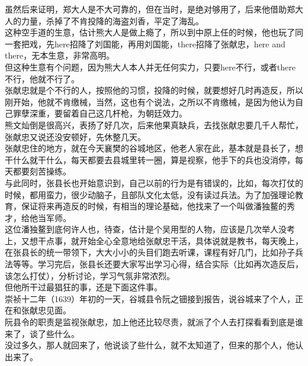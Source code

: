 \begin{multicols}{\theparacolNo}
虽然后来证明，郑大人是不大可靠的，但在当时，是绝对够用了，后来他借助郑大人的力量，杀掉了不肯投降的海盗刘香，平定了海乱。\\

这种空手道的生意，估计熊大人是做上瘾了，所以到中原上任的时候，他也玩了同一套把戏，先here招降了刘国能，再用刘国能，there招降了张献忠，here and there，无本生意，非常高明。\\

但这种生意有个问题，因为熊大人本人并无任何实力，只要here不行，或者there不行，他就不行了。\\

张献忠就是个不行的人，按照他的习惯，投降的时候，就要想好几时再造反，所以刚开始，他就不肯缴械，当然，这也有个说法，之所以不肯缴械，是因为他认为自己罪孽深重，要留着自己这几杆枪，为朝廷效力。\\

熊文灿倒是很高兴，表扬了好几次，后来他果真缺兵，去找张献忠要几千人帮忙，张献忠又说还没安顿好，先休整几天。\\

张献忠住的地方，就在今天襄樊的谷城地区，他老人家在此，基本就是县长了，想干什么就干什么，每天都要去县城里转一圈，算是视察，他手下的兵也没消停，每天都要刻苦操练。\\

与此同时，张县长也开始意识到，自己以前的行为是有错误的，比如，每次打仗的时候，都用蛮力，很少动脑子，且部队文化太低，没有读过兵法。为了加强理论教育，保证将来再造反的时候，有相当的理论基础，他找来了一个叫做潘独鳌的秀才，给他当军师。\\

这位潘独鳌到底何许人也，待查，估计是个吴用型的人物，应该是几次举人没考上，又想干点事，就开始全心全意地给张献忠干活，具体说就是教书，每天晚上，在张县长的统一带领下，大大小小的头目们跑去听课，课程有好几门，比如孙子兵法等等。学习完后，张县长还要大家写出学习心得，结合实际（比如再次造反后，该怎么打仗），分析讨论，学习气氛非常浓烈。\\

但他所干过最猖狂的事，还是下面这件事。\\

崇祯十二年（1639）年初的一天，谷城县令阮之钿接到报告，说谷城来了个人，正在和张献忠见面。\\

阮县令的职责是监视张献忠，加上他还比较尽责，就派了个人去打探看看到底是谁来了，谈了些什么。\\

没过多久，那人就回来了，他说谈了些什么，就不太知道了，但来的那个人，他认出来了。\\


\end{multicols}
